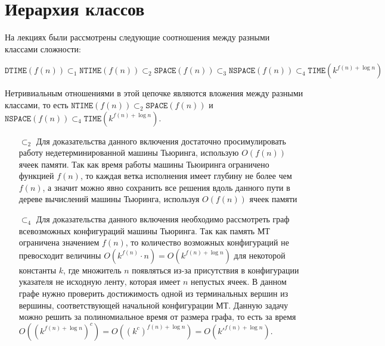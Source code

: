 \documentclass[
    11pt,
    a4paper
]{article}
\theoremstyle{definition}
\begin{document}
\section{Иерархия классов}

На лекциях были рассмотрены следующие соотношения между разными классами сложности:

$$\texttt{DTIME}(f(n)) \subset_1 \texttt{NTIME}(f(n)) \subset_2 \texttt{SPACE}(f(n)) \subset_3 \texttt{NSPACE}(f(n)) \subset_4 \texttt{TIME}(k^{f(n) + \log n})$$

Нетривиальным отношениями в этой цепочке являются вложения между разными классами, то есть $\texttt{NTIME}(f(n)) \subset_2 \texttt{SPACE}(f(n))$ и $\texttt{NSPACE}(f(n)) \subset_4 \texttt{TIME}(k^{f(n) + \log n})$.
\begin{itemize}
\item[$\subset_2$] Для доказательства данного включения достаточно просимулировать работу недетерминированной машины Тьюринга, использую $O(f(n))$ ячеек памяти. Так как время работы машины Тьюиринга ограничено функцией $f(n)$, то каждая ветка исполнения имеет глубину не более чем $f(n)$, а значит можно явно сохранить все решения вдоль данного пути в дереве вычислений машины Тьюринга, используя $O(f(n))$ ячеек памяти
\item[$\subset_4$] Для доказательства данного включения необходимо рассмотреть граф всевозможных конфигураций машины Тьюринга. Так как память МТ ограничена значением $f(n)$, то количество возможных конфигураций не превосходит величины $O(k^{f(n)} \cdot n) = O(k^{f(n) + \log n})$ для некоторой константы $k$, где множитель $n$ появляться из-за присутствия в конфигурации указателя не исходную ленту, которая имеет $n$ непустых ячеек. В данном графе нужно проверить достижимость одной из терминальных вершин из вершины, соответствующей начальной конфигурации МТ. Данную задачу можно решить за полиномиальное время от размера графа, то есть за время $O((k^{f(n) + \log n})^c) = O((k^c)^{f(n) + \log n}) = O(k'^{f(n) + \log n})$.
\end{itemize}
\end{document}
